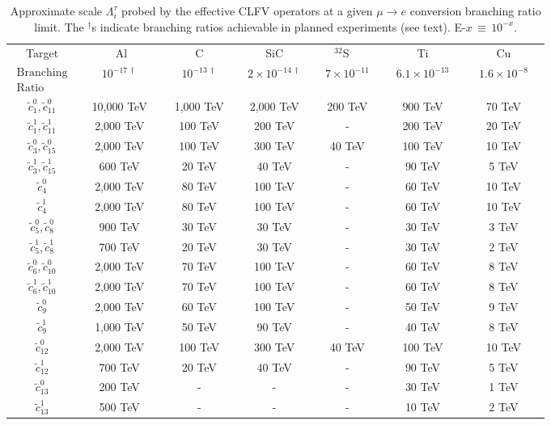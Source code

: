\documentclass[12pt,letterpaper]{book}
\begin{document}
\begin{table}
\centering
{\renewcommand{\arraystretch}{1.5}
\begin{tabular}{ccccccc}
\hline
\hline
Target  &~~~~~ Al~~~~~&~~~~~C~~~~~&~~~~SiC~~~~&~~~$^{32}$S~~~~~&~~~~~Ti~~~~~&~~~~~Cu~~~~~ \\[1.6pt]
$\begin{array}{l} \mathrm{Branching} \\  \mathrm{Ratio} \end{array}$ & $10^{-17 \, \dagger}$ & $10^{-13 \, \dagger}$ & $2 \times 10^{-14 \, \dagger}$ & $7 \times 10^{-11}$ &  $6.1 \times 10^{-13}$  & $1.6 \times 10^{-8}$ \\
\hline
\hline
$\tilde{c}_1^0,\tilde{c}_{11}^0$ &  10,000 TeV & 1,000 TeV & 2,000 TeV & 200 TeV & 900 TeV & 70 TeV\\
$\tilde{c}_1^1,\tilde{c}_{11}^1$ & 2,000 TeV & 100 TeV & 200 TeV & - & 200 TeV & 20 TeV\\
$\tilde{c}_3^0,\tilde{c}_{15}^0$ & 2,000 TeV & 100 TeV & 300 TeV & 40 TeV & 100 TeV & 10 TeV\\
$\tilde{c}_3^1,\tilde{c}_{15}^1$ & 600 TeV & 20 TeV & 40 TeV & - & 90 TeV & 5 TeV\\
$\tilde{c}_4^0$ & 2,000 TeV & 80 TeV & 100 TeV & - & 60 TeV & 10 TeV\\
$\tilde{c}_4^1$ & 2,000 TeV & 80 TeV & 100 TeV & - & 60 TeV & 10 TeV\\
$\tilde{c}_5^0,\tilde{c}_8^0$ & 900 TeV & 30 TeV & 30 TeV & - & 30 TeV & 3 TeV\\
$\tilde{c}_5^1,\tilde{c}_8^1$ & 700 TeV & 20 TeV & 30 TeV & - & 30 TeV & 2 TeV\\
$\tilde{c}_6^0,\tilde{c}_{10}^0$ & 2,000 TeV & 70 TeV & 100 TeV & - & 60 TeV & 8 TeV\\
$\tilde{c}_6^1,\tilde{c}_{10}^1$ & 2,000 TeV & 70 TeV & 100 TeV & - & 60 TeV & 8 TeV\\
$\tilde{c}_9^0$ & 2,000 TeV & 60 TeV & 100 TeV & - & 50 TeV & 9 TeV\\
$\tilde{c}_9^1$ & 1,000 TeV & 50 TeV & 90 TeV & - & 40 TeV & 8 TeV\\
$\tilde{c}_{12}^0$ & 2,000 TeV & 100 TeV & 300 TeV & 40 TeV & 100 TeV & 10 TeV\\
$\tilde{c}_{12}^1$ & 700 TeV & 20 TeV & 40 TeV & - & 90 TeV & 5 TeV\\
$\tilde{c}_{13}^0$ & 200 TeV & - & - & - & 30 TeV & 1 TeV\\
$\tilde{c}_{13}^1$ & 500 TeV & - & - & - & 10 TeV & 2 TeV\\[2.6pt]
\hline
\hline
\end{tabular}
}
\caption{Approximate scale $\Lambda_i^{\tau}$ probed by the effective CLFV operators at a given $\mu \rightarrow e$ conversion branching ratio limit.  The $^\dagger$s indicate  
branching ratios achievable in planned experiments (see text).   E-$x \, \equiv \,10^{-x}.$}
\label{tab:LEC_scale}
\end{table} 
\end{document}
